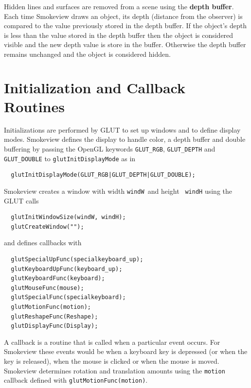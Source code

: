 \documentclass[11pt,twoside]{book}
\begin{document}
Hidden lines and surfaces are removed from a scene using the {\bf
depth buffer}.  Each time Smokeview draws an object, its depth
(distance from the observer) is compared to the value previously
stored in the depth buffer.  If the object's depth is less than
the value stored in the depth buffer then the object is considered
visible and the new depth value is store in the buffer. Otherwise
the depth buffer remains unchanged and the object is considered
hidden.

\section{Initialization and Callback Routines}
Initializations are performed by GLUT to set up windows and to
define display modes.  Smokeview defines the display to handle
color, a depth buffer and double buffering by passing the OpenGL
keywords {\tt GLUT\_RGB}, {\tt GLUT\_DEPTH} and {\tt GLUT\_DOUBLE}
to {\tt glutInitDisplayMode} as in

\begin{verbatim}
  glutInitDisplayMode(GLUT_RGB|GLUT_DEPTH|GLUT_DOUBLE);
\end{verbatim}

Smokeview creates a window with width {\tt windW}\ and height {\tt
windH} using the GLUT calls

\begin{verbatim}
  glutInitWindowSize(windW, windH);
  glutCreateWindow("");
\end{verbatim}

and defines callbacks with

\begin{verbatim}
  glutSpecialUpFunc(specialkeyboard_up);
  glutKeyboardUpFunc(keyboard_up);
  glutKeyboardFunc(keyboard);
  glutMouseFunc(mouse);
  glutSpecialFunc(specialkeyboard);
  glutMotionFunc(motion);
  glutReshapeFunc(Reshape);
  glutDisplayFunc(Display);
\end{verbatim}

A callback is a routine that is called when a particular event
occurs.  For Smokeview these events would be when a keyboard key
is depressed (or when the key is released), when the mouse is
clicked or when the mouse is moved.  Smokeview determines rotation
and translation amounts using the {\tt motion} callback defined
with {\tt glutMotionFunc(motion)}.

%
%

\end{document}
